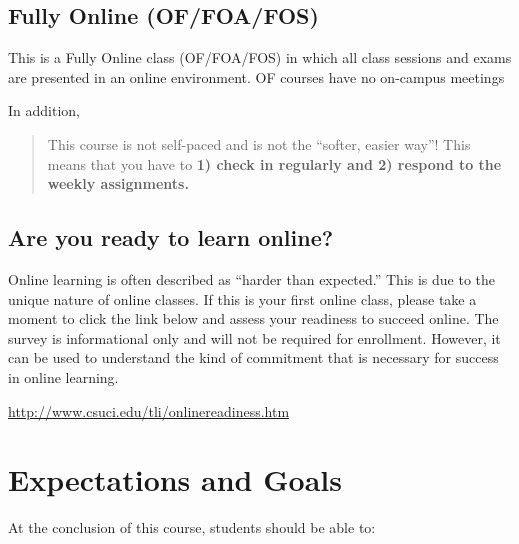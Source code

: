 \documentclass[11pt,]{article}
\begin{document}
\hypertarget{fully-online-offoafos}{%
\subsection{Fully Online (OF/FOA/FOS)}\label{fully-online-offoafos}}

This is a Fully Online class (OF/FOA/FOS) in which all class sessions
and exams are presented in an online environment. OF courses have no
on-campus meetings

In addition,

\begin{quote}
This course is not self-paced and is not the ``softer, easier way''!
This means that you have to \textbf{1) check in regularly and 2) respond
to the weekly assignments.}
\end{quote}

\hypertarget{are-you-ready-to-learn-online}{%
\subsection{Are you ready to learn
online?}\label{are-you-ready-to-learn-online}}

Online learning is often described as ``harder than expected.'' This is
due to the unique nature of online classes. If this is your first online
class, please take a moment to click the link below and assess your
readiness to succeed online. The survey is informational only and will
not be required for enrollment. However, it can be used to understand
the kind of commitment that is necessary for success in online learning.

\url{http://www.csuci.edu/tli/onlinereadiness.htm}

\hypertarget{expectations-and-goals}{%
\section{Expectations and Goals}\label{expectations-and-goals}}

At the conclusion of this course, students should be able to:
\end{document}
